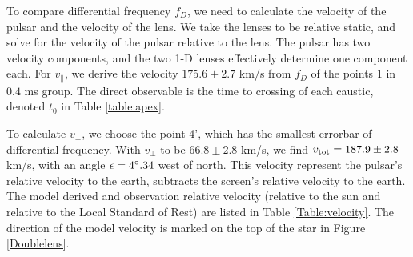 \documentclass[useAMS,usenatbib]{mn2e}
\begin{document}
To compare differential frequency $f_D$, we need to calculate the
velocity of the pulsar and the velocity of the lens. We take the
lenses to be relative static, and solve for the velocity of the pulsar
relative to the lens.  The pulsar has two velocity components, and the
two 1-D lenses effectively determine one component each.
For $v_{\parallel}$, we derive the velocity $175.6 \pm 2.7$ km/s from $f_D$ of the points 1 in $0.4$ ms group.  The direct
observable is the time to crossing of each caustic, denoted $t_0$ in
Table \ref{table:apex}. 

To calculate $v_{\bot}$, we choose the point 4', which has the smallest
errorbar of differential frequency.
With $v_{\bot}$ to be $66.8\pm 2.8$ km/s, we find $v_{\rm tot}=187.9 \pm 2.8$ km/s, with an angle $\epsilon=4\degree.34$ west of north. This velocity represent the pulsar's relative velocity to the earth, subtracts the screen's relative velocity to the earth. The model derived and observation relative velocity (relative to the sun and relative to the Local Standard of Rest) are listed in Table \ref{Table:velocity}. The
direction of the model velocity is marked on the top of the star in
Figure \ref{Doublelens}.

\end{document}
